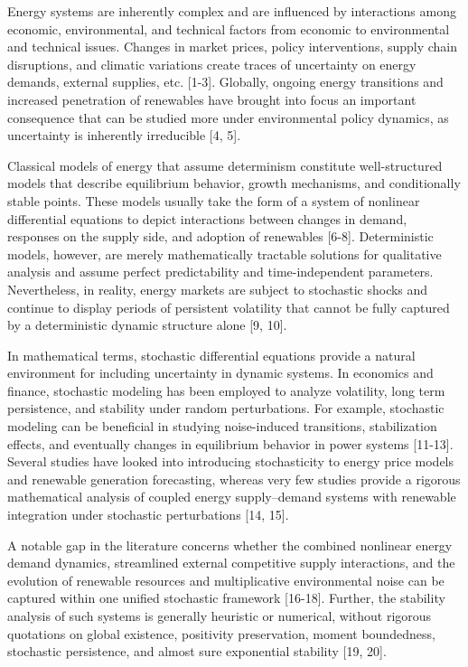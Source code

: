 \documentclass[11pt]{article}
\numberwithin{equation}{section}
\begin{document}
Energy systems are inherently complex and are influenced by interactions among economic, environmental, and technical factors from economic to environmental and technical issues. Changes in market prices, policy interventions, supply chain disruptions, and climatic variations create traces of uncertainty on energy demands, external supplies, etc. [1-3]. Globally, ongoing energy transitions and increased penetration of renewables have brought into focus an important consequence that can be studied more under environmental policy dynamics, as uncertainty is inherently irreducible [4, 5].

Classical models of energy that assume determinism constitute well-structured models that describe equilibrium behavior, growth mechanisms, and conditionally stable points. These models usually take the form of a system of nonlinear differential equations to depict interactions between changes in demand, responses on the supply side, and adoption of renewables [6-8]. Deterministic models, however, are merely mathematically tractable solutions for qualitative analysis and assume perfect predictability and time-independent parameters. Nevertheless, in reality, energy markets are subject to stochastic shocks and continue to display periods of persistent volatility that cannot be fully captured by a deterministic dynamic structure alone [9, 10].

In mathematical terms, stochastic differential equations provide a natural environment for including uncertainty in dynamic systems. In economics and finance, stochastic modeling has been employed to analyze volatility, long term persistence, and stability under random perturbations. For example, stochastic modeling can be beneficial in studying noise-induced transitions, stabilization effects, and eventually changes in equilibrium behavior in power systems [11-13]. Several studies have looked into introducing stochasticity to energy price models and renewable generation forecasting, whereas very few studies provide a rigorous mathematical analysis of coupled energy supply–demand systems with renewable integration under stochastic perturbations [14, 15].

A notable gap in the literature concerns whether the combined nonlinear energy demand dynamics, streamlined external competitive supply interactions, and the evolution of renewable resources and multiplicative environmental noise can be captured within one unified stochastic framework [16-18]. Further, the stability analysis of such systems is generally heuristic or numerical, without rigorous quotations on global existence, positivity preservation, moment boundedness, stochastic persistence, and almost sure exponential stability [19, 20].
\end{document}
